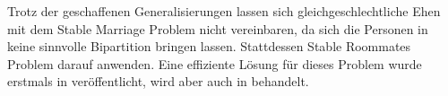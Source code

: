 Trotz der geschaffenen Generalisierungen lassen sich gleichgeschlechtliche Ehen mit dem Stable Marriage Problem nicht vereinbaren, da sich die Personen in keine sinnvolle Bipartition bringen lassen. Stattdessen Stable Roommates Problem darauf anwenden. Eine effiziente Lösung für dieses Problem wurde erstmals in \cite{Irving:1985} veröffentlicht, wird aber auch in \cite{Gusfield:1989} behandelt.
